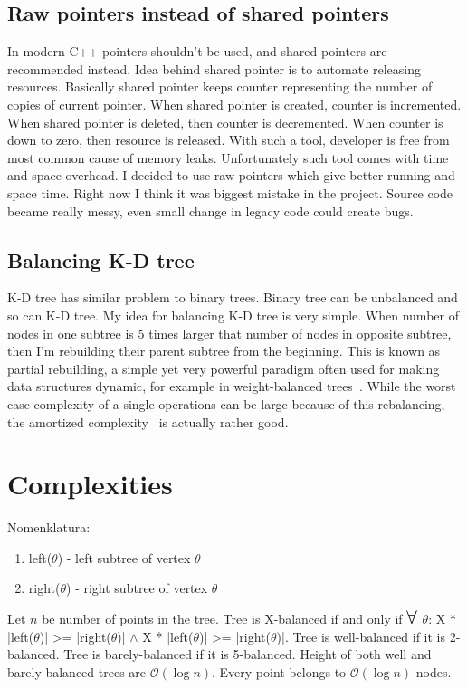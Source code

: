 \documentclass[10pt,a4paper]{article}
\newcommand{\Oh}{\mathcal{O}}
\newcommand\bigforall{\mbox{\Large $\mathsurround0pt\forall$}}
\begin{document}
\subsection{Raw pointers instead of shared pointers}

In modern C++ pointers shouldn't be used, and shared pointers are recommended instead. Idea behind shared pointer is to automate releasing resources. Basically shared pointer keeps counter representing the number of copies of current pointer. When shared pointer is created, counter is incremented. When shared pointer is deleted, then counter is decremented. When counter is down to zero, then resource is released. With such a tool, developer is free from most common cause of memory leaks. Unfortunately such tool comes with time and space overhead. I decided to use raw pointers which give better running and space time.
Right now I think it was biggest mistake in the project. Source code became really messy, even small change in legacy code could create bugs.

\subsection{Balancing K-D tree}
K-D tree has similar problem to binary trees. Binary tree can be unbalanced and so can K-D tree. My idea for balancing K-D tree is very simple. When number of nodes in one subtree is 5 times larger that number of nodes in opposite subtree, then I'm rebuilding their parent subtree from the beginning.
This is known as partial rebuilding, a simple yet very powerful paradigm often used for making data structures dynamic, for example in weight-balanced trees~\cite{ALPHATREES}. While the worst case complexity of a single operations can be large because of this rebalancing, the amortized complexity~\cite{AMOR} is actually rather good.


\section{Complexities}

Nomenklatura:
\begin{enumerate}
\item left($\theta$) - left subtree of vertex $\theta$
\item right($\theta$) - right subtree of vertex $\theta$
\end{enumerate}

Let $n$ be number of points in the tree. Tree is X-balanced if and only if $\bigforall$ $\theta$: X * |left($\theta$)| >= |right($\theta$)| $\wedge$ X * |left($\theta$)| >= |right($\theta$)|. Tree is well-balanced if it is 2-balanced. Tree is barely-balanced if it is 5-balanced. Height of both well and barely balanced trees are $\Oh(\log n)$. Every point belongs to $\Oh(\log n)$ nodes. 
\end{document}
